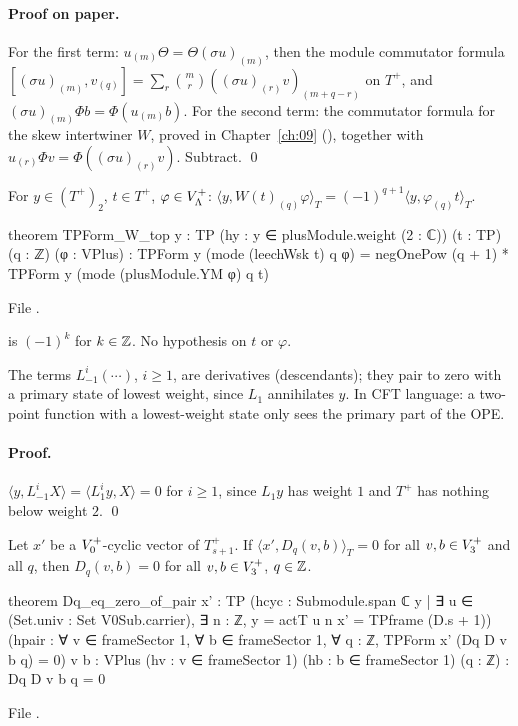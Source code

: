 \paragraph{Proof on paper.}  For the first term: $u_{(m)}\Theta=\Theta(\sigma u)_{(m)}$, then the module
commutator formula $[(\sigma u)_{(m)},v_{(q)}]=\sum_r\binom mr((\sigma u)_{(r)}v)_{(m+q-r)}$ on $T^+$, and
$(\sigma u)_{(m)}\Phi b=\Phi(u_{(m)}b)$.  For the second term: the commutator formula for the skew
intertwiner $W$, proved in Chapter~\ref{ch:09} (), together with
$u_{(r)}\Phi v=\Phi((\sigma u)_{(r)}v)$.  Subtract. \qed

\begin{lemma}[Only the $i=0$ term of $W$ survives against weight 2]\label{ch14:lem:Wtop}
For $y\in(T^+)_2$, $t\in T^+$, $\varphi\in V_{\Lambda}^+$:
$\langle y,W(t)_{(q)}\varphi\rangle_T=(-1)^{q+1}\langle y,\varphi_{(q)}t\rangle_T$.
\end{lemma}
\begin{leancode}
theorem TPForm_W_top {y : TP} (hy : y ∈ plusModule.weight (2 : ℂ)) (t : TP) (q : ℤ) (φ : VPlus) :
    TPForm y (mode (leechWsk t) q φ) = negOnePow (q + 1) * TPForm y (mode (plusModule.YM φ) q t)
\end{leancode}
File .

\begin{dictionary}
 is $(-1)^k$ for $k\in{\mathbb{Z}}$.  No hypothesis on $t$ or $\varphi$.
\end{dictionary}

\begin{physics}
The terms $L_{-1}^i(\cdots)$, $i\ge1$, are derivatives (descendants); they pair to zero with a
primary state of lowest weight, since $L_1$ annihilates $y$.  In CFT language: a two-point function
with a lowest-weight state only sees the primary part of the OPE.
\end{physics}

\paragraph{Proof.}  $\langle y,L_{-1}^iX\rangle=\langle L_1^iy,X\rangle=0$ for $i\ge1$, since $L_1y$ has weight $1$
and $T^+$ has nothing below weight $2$. \qed

\begin{theorem}\label{ch14:thm:li}
Let $x'$ be a $V_0^{+}$-cyclic vector of $T_{s+1}^+$.  If $\langle x',D_q(v,b)\rangle_T=0$ for all
$v,b\in V_3^{+}$ and all $q$, then $D_q(v,b)=0$ for all $v,b\in V_3^{+}$, $q\in{\mathbb{Z}}$.
\end{theorem}
\begin{leancode}
theorem Dq_eq_zero_of_pair {x' : TP}
    (hcyc : Submodule.span ℂ {y | ∃ u ∈ (Set.univ : Set V0Sub.carrier), ∃ n : ℤ, y = actT u n x'}
      = TPframe (D.s + 1))
    (hpair : ∀ v ∈ frameSector 1, ∀ b ∈ frameSector 1, ∀ q : ℤ, TPForm x' (Dq D v b q) = 0)
    {v b : VPlus} (hv : v ∈ frameSector 1) (hb : b ∈ frameSector 1) (q : ℤ) : Dq D v b q = 0
\end{leancode}
File .

